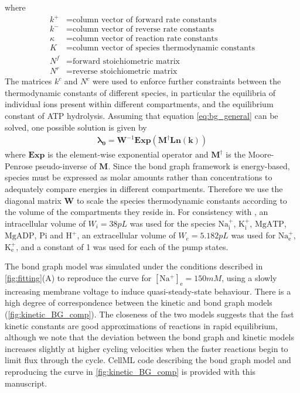 \documentclass[fleqn,10pt]{physiome}
\begin{document}
where
\begin{align}
	k^+ &= \text{column vector of forward rate constants} \\
	k^- &= \text{column vector of reverse rate constants} \\
	\kappa &= \text{column vector of reaction rate constants} \\
	K &= \text{column vector of species thermodynamic constants} \\
	N^f &= \text{forward stoichiometric matrix} \\
	N^r &= \text{reverse stoichiometric matrix}
\end{align}
The matrices $k^c$ and $N^c$ were used to enforce further constraints between the thermodynamic constants of different species, in particular the equilibria of individual ions present within different compartments, and the equilibrium constant of ATP hydrolysis. Assuming that equation \eqref{eq:bg_general} can be solved, one possible solution is given by
\begin{align}
	\boldsymbol{\lambda_0 } = \mathbf{W}^{-1} \textbf{Exp} (\mathbf{M}^\dagger \textbf{Ln} (\mathbf{k}))
\end{align}
where $\textbf{Exp}$ is the element-wise exponential operator and $\mathbf{M}^\dagger$ is the Moore-Penrose pseudo-inverse of $\mathbf{M}$. Since the bond graph framework is energy-based, species must be expressed as molar amounts rather than concentrations to adequately compare energies in different compartments. Therefore we use the diagonal matrix $\mathbf{W}$ to scale the species thermodynamic constants according to the volume of the compartments they reside in. For consistency with  \citet{terkildsen_balance_2007}, an intracellular volume of $W_i = 38\si{pL}$ was used for the species $\mathrm{Na_i^+}$, $\mathrm{K_i^+}$, $\mathrm{MgATP}$, $\mathrm{MgADP}$, $\mathrm{Pi}$ and $\mathrm{H^+}$, an extracellular volume of $W_e = 5.182\si{pL}$ was used for $\mathrm{Na_e^+}$, $\mathrm{K_e^+}$, and a constant of 1 was used for each of the pump states.

The bond graph model was simulated under the conditions described in \autoref{fig:fitting}(A) to reproduce the curve for $\mathrm{[Na^+]_e}=150\si{mM}$, using a slowly increasing membrane voltage to induce quasi-steady-state behaviour. There is a high degree of correspondence between the kinetic and bond graph models (\autoref{fig:kinetic_BG_comp}). The closeness of the two models suggests that the fast kinetic constants are good approximations of reactions in rapid equilibrium, although we note that the deviation between the bond graph and kinetic models increases slightly at higher cycling velocities when the faster reactions begin to limit flux through the cycle. CellML code describing the bond graph model and reproducing the curve in \autoref{fig:kinetic_BG_comp} is provided with this manuscript.
\end{document}
